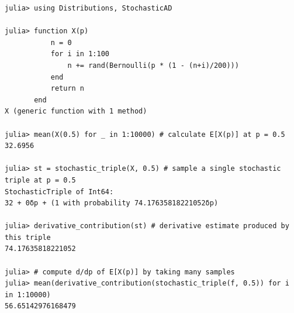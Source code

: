 

\begin{verbatim}
julia> using Distributions, StochasticAD

julia> function X(p)
           n = 0
           for i in 1:100
               n += rand(Bernoulli(p * (1 - (n+i)/200)))
           end
           return n
       end
X (generic function with 1 method)

julia> mean(X(0.5) for _ in 1:10000) # calculate E[X(p)] at p = 0.5
32.6956

julia> st = stochastic_triple(X, 0.5) # sample a single stochastic triple at p = 0.5
StochasticTriple of Int64:
32 + 0δp + (1 with probability 74.17635818221052δp)

julia> derivative_contribution(st) # derivative estimate produced by this triple
74.17635818221052

julia> # compute d/dp of E[X(p)] by taking many samples
julia> mean(derivative_contribution(stochastic_triple(f, 0.5)) for i in 1:10000)
56.65142976168479
\end{verbatim}

